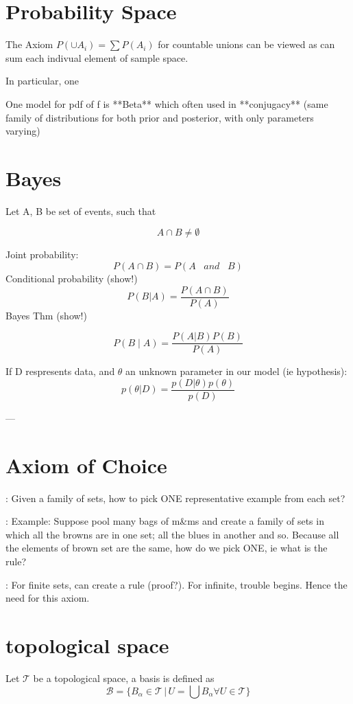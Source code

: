 \documentclass{article}
\begin{document}
\section{Probability Space}

The Axiom $P(\cup A_i) = \sum P(A_i)$ for countable unions can be viewed as
can sum each indivual element of sample space.

In particular, one 

One model for pdf   of f is **Beta**
which often used in **conjugacy** (same family of distributions for both prior
and posterior,  with only parameters varying)

\section{Bayes}

Let A, B be set of events, such that \

$$A \cap B \neq \emptyset$$

Joint probability: \
$$P(A \cap B) = P(A \hspace{10pt} and \hspace{10pt} B)$$
Conditional probability (show!) 
$$P(B \lvert A) = \frac{P(A \cap B)}{P(A)}$$
Bayes Thm (show!) \ 

$$P(B \mid A) = \frac{P(A \lvert B)P(B)}{P(A)}$$


If D respresents data, and $\theta$ an unknown parameter in our model (ie
hypothesis):
$$p(\theta | D) = \frac{p(D|\theta) p(\theta)} {p(D)}$$


---
\section{Axiom of Choice}
:	Given a family of sets, how to pick ONE representative example from each
set?	

:	Example:	Suppose pool many bags of m\&ms and create a family of sets in
which all the browns are in one set; all the blues in another and so.  Because
all the elements of brown set are the same, how do we pick ONE, ie what is the
rule?

:	For finite sets, can create a rule (proof?).  For infinite, trouble begins.
Hence the need for this axiom.  

\section{topological space}
Let \( \mathcal{T} \) be a topological space, a basis is defined as
\[
 \mathcal{B} = \{B_{\alpha} \in \mathcal{T}\, |\,  U = \bigcup B_{\alpha} \forall U \in \mathcal{T} \}
\]
\end{document}
